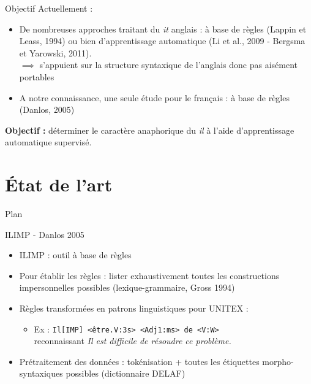 \documentclass{beamer}
\begin{document}
\begin{frame}{Objectif}
Actuellement :
\begin{itemize}
  \item De nombreuses approches traitant du \og \textit{it} \fg{} anglais : à base de règles (Lappin et Leass, 1994) ou bien d'apprentissage automatique (Li et al., 2009 - Bergsma et Yarowski, 2011).\\
  $\implies$ s'appuient sur la structure syntaxique de l'anglais donc pas aisément portables
  \item A notre connaissance, une seule étude pour le français : à base de règles (Danlos, 2005)
\end{itemize}
\vskip 1cm
\textbf{Objectif :} déterminer le caractère anaphorique du \og \textit{il} \fg{} à l'aide d'apprentissage automatique supervisé.
\end{frame}

\section{État de l'art}

\begin{frame}{Plan}
  \tableofcontents[currentsection]
\end{frame}

\begin{frame}{ILIMP - Danlos 2005}
\begin{itemize}
  \item ILIMP : outil à base de règles
  \item Pour établir les règles : lister exhaustivement toutes les constructions impersonnelles possibles (lexique-grammaire, Gross 1994)
  \item Règles transformées en patrons linguistiques pour UNITEX :\\
  \begin{itemize}
    \item Ex : \verb!Il[IMP] <être.V:3s> <Adj1:ms> de <V:W>!\\
  reconnaissant \og{}\textit{Il est difficile de résoudre ce problème.}\fg{}
  \end{itemize}
  \item Prétraitement des données : tokénisation + toutes les étiquettes morpho-syntaxiques possibles (dictionnaire DELAF)
\end{itemize}
\end{frame}
\end{document}
